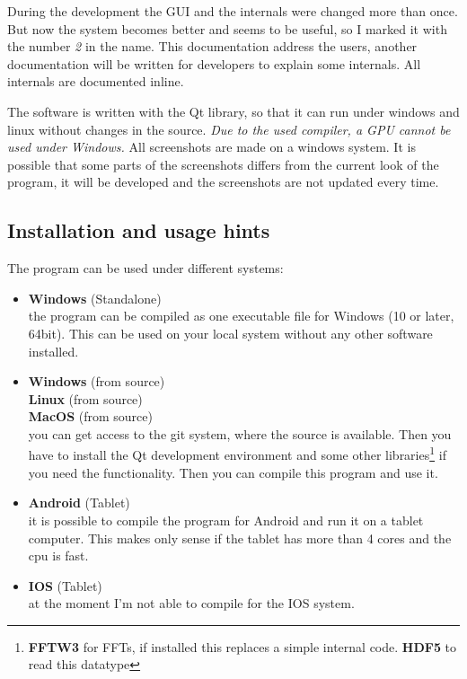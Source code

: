 \documentclass[11pt]{article} %
\begin{document}
During the development the GUI and the internals were changed more than once. But now the system becomes better and seems to be useful, so I marked it with the number {\it 2} in the name. This documentation address the users, another documentation will be written for developers to explain some internals. All internals are documented inline.

The software is written with the Qt library, so that it can run under windows and linux without changes in the source. {\it Due to the used compiler, a GPU cannot be used under Windows.} All screenshots are made on a windows system. It is possible that some parts of the screenshots differs from the current look of the program, it will be developed and the screenshots are not updated every time.

\subsection{Installation and usage hints}

The program can be used under different systems:
\begin{itemize}\itemsep0pt
\item {\bf Windows} (Standalone) \\
	the program can be compiled as one executable file for Windows (10 or later, 64bit). This can be used on your local system without any other software installed.
\item {\bf Windows} (from source) \\
	{\bf Linux} (from source) \\
	{\bf MacOS} (from source) \\
	you can get access to the git system, where the source is available. Then you have to install the Qt development environment and some other libraries\footnote{{\bf FFTW3} for FFTs, if installed this replaces a simple internal code. {\bf HDF5} to read this datatype} if you need the functionality. Then you can compile this program and use it.
\item {\bf Android} (Tablet) \\
	it is possible to compile the program for Android and run it on a tablet computer. This makes only sense if the tablet has more than 4 cores and the cpu is fast.
\item {\bf IOS} (Tablet) \\
	at the moment I'm not able to compile for the IOS system.
\end{itemize}

\clearpage
\end{document}
